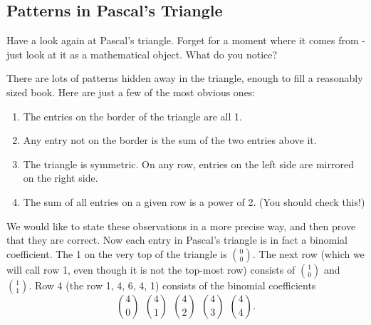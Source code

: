 \documentclass[10pt,]{book}
\theoremstyle{plain}
\theoremstyle{definition}
\theoremstyle{definition}
\theoremstyle{definition}
\numberwithin{equation}{section}
\def\entry{\entry}
\def\entry{\entry}
\newcommand{\hexbox}[3]{
  \def\x{-cos{30}*\r*#1+cos{30}*#2*\r*2}
  \def\y{-\r*#1-sin{30}*\r*#1}
  \draw (\x,\y) +(90:\r) -- +(30:\r) -- +(-30:\r) -- +(-90:\r) -- +(-150:\r) -- +(150:\r) -- cycle;
  \draw (\x,\y) node{#3};
}
\begin{document}
\subsection[Patterns in Pascal's Triangle]{Patterns in Pascal's Triangle}\label{subsec_patternsPascal}

      Have a look again at Pascal's triangle. Forget for a moment where it comes from - just look at it as a mathematical object. What do you notice?
\leavevmode%
\begin{figure}
\centering
{
}
\end{figure}
\par

      There are lots of patterns hidden away in the triangle, enough to fill a reasonably sized book. Here are just a few of the most obvious ones:
\leavevmode%
\begin{enumerate}
\item\hypertarget{li-510}{}
The entries on the border of the triangle are all 1.
%
\item\hypertarget{li-511}{}
Any entry not on the border is the sum of the two entries above it.
%
\item\hypertarget{li-512}{}
The triangle is symmetric.  On any row, entries on the left side are mirrored on the right side.
%
\item\hypertarget{li-513}{}
The sum of all entries on a given row is a power of 2. (You should check this!)
%
\end{enumerate}
\par

      We would like to state these observations in a more precise way, and then prove that they are correct. Now each entry in Pascal's triangle is in fact a binomial coefficient. The 1 on the very top of the triangle is \({0 \choose 0}\). The next row (which we will call row 1, even though it is not the top-most row) consists of \({1 \choose 0}\) and \({1 \choose 1}\). Row 4 (the row 1, 4, 6, 4, 1) consists of the binomial coefficients
      \begin{equation*}
        {4 \choose 0} ~~ {4 \choose 1} ~~ {4 \choose 2} ~~ {4 \choose 3} ~~ {4 \choose 4}.
      \end{equation*}
\par
\end{document}
